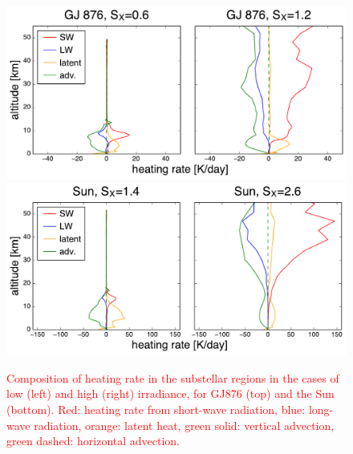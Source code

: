 \documentclass[11pt,numberedappendix,twocolappendix,]{emulateapj}
\def\addYF#1{\textcolor{red}{#1}}
\begin{document}
\begin{figure}[tb]
    \begin{center}
\includegraphics[width=\hsize]{GJ876_heating_rate.pdf}
\includegraphics[width=\hsize]{Sun_heating_rate.pdf}
    \end{center}
    \caption{\addYF{Composition of heating rate in the substellar regions in the cases of low (left) and high (right) irradiance, for GJ876 (top) and the Sun (bottom). Red: heating rate from short-wave radiation, blue: long-wave radiation, orange: latent heat, green solid: vertical advection, green dashed: horizontal advection.}}
\label{fig:heating_rate}
\end{figure}
\end{document}
